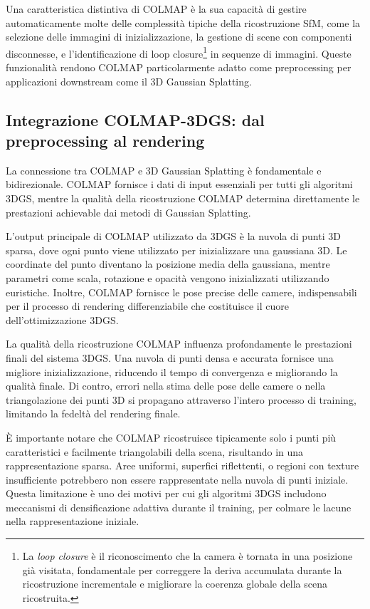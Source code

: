 Una caratteristica distintiva di COLMAP è la sua capacità di gestire automaticamente molte delle complessità tipiche della ricostruzione SfM, come la selezione delle immagini di inizializzazione, la gestione di scene con componenti disconnesse, e l'identificazione di loop closure\footnote{La \emph{loop closure} è il riconoscimento che la camera è tornata in una posizione già visitata, fondamentale per correggere la deriva accumulata durante la ricostruzione incrementale e migliorare la coerenza globale della scena ricostruita.} in sequenze di immagini. Queste funzionalità rendono COLMAP particolarmente adatto come preprocessing per applicazioni downstream come il 3D Gaussian Splatting.

\subsection{Integrazione COLMAP-3DGS: dal preprocessing al rendering}

La connessione tra COLMAP e 3D Gaussian Splatting è fondamentale e bidirezionale. COLMAP fornisce i dati di input essenziali per tutti gli algoritmi 3DGS, mentre la qualità della ricostruzione COLMAP determina direttamente le prestazioni achievable dai metodi di Gaussian Splatting.

L'output principale di COLMAP utilizzato da 3DGS è la nuvola di punti 3D sparsa, dove ogni punto viene utilizzato per inizializzare una gaussiana 3D. Le coordinate del punto diventano la posizione media della gaussiana, mentre parametri come scala, rotazione e opacità vengono inizializzati utilizzando euristiche. Inoltre, COLMAP fornisce le pose precise delle camere, indispensabili per il processo di rendering differenziabile che costituisce il cuore dell'ottimizzazione 3DGS.

La qualità della ricostruzione COLMAP influenza profondamente le prestazioni finali del sistema 3DGS. Una nuvola di punti densa e accurata fornisce una migliore inizializzazione, riducendo il tempo di convergenza e migliorando la qualità finale. Di contro, errori nella stima delle pose delle camere o nella triangolazione dei punti 3D si propagano attraverso l'intero processo di training, limitando la fedeltà del rendering finale.

È importante notare che COLMAP ricostruisce tipicamente solo i punti più caratteristici e facilmente triangolabili della scena, risultando in una rappresentazione sparsa. Aree uniformi, superfici riflettenti, o regioni con texture insufficiente potrebbero non essere rappresentate nella nuvola di punti iniziale. Questa limitazione è uno dei motivi per cui gli algoritmi 3DGS includono meccanismi di densificazione adattiva durante il training, per colmare le lacune nella rappresentazione iniziale.

